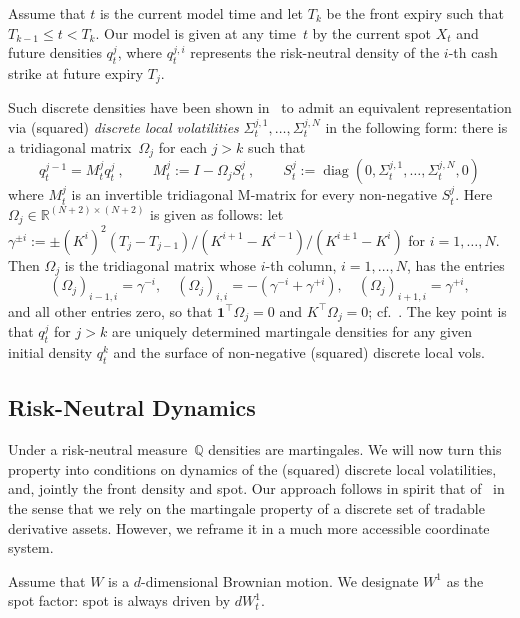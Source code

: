 \documentclass[smallextended,envcountsame,envcountsect]{svjour3}
\newcommand{\Q}{\mathbb Q}
\newcommand{\one}{\mathbf 1}
\begin{document}
Assume that $t$ is the current model time and let $T_k$ be the front expiry such that $T_{k-1}\leq t<T_k$.
Our model is given at any time~$t$
by the current spot $X_t$ and future densities $q_t^j$, where $q_t^{j,i}$ represents the risk-neutral density of the $i$-th cash strike at future expiry $T_j$.

Such discrete densities have been shown in~\citet{DLV} to admit an equivalent representation via (squared) \emph{discrete local volatilities} $\Sigma_t^{j,1},\ldots,\Sigma_t^{j,N}$ in the following form:
there is a tridiagonal matrix~$\Omega_j$ for each $j>k$ such that
  \begin{equation}
    q_t^{j-1}=M_t^jq_t^j \ ,
    \qquad
    M_t^j:=I-\Omega_jS_t^j \ ,
    \qquad
    S_t^j:=\operatorname{diag}(0,\Sigma_t^{j,1},\ldots,
      \Sigma_t^{j,N},0) 
    \label{eq:hb_dlv}
  \end{equation}
where $M^j_t$ is an invertible tridiagonal M-matrix for every non-negative $S_t^j$. Here $\Omega_j\in\mathbb R^{(N+2)\times(N+2)}$ is given as follows: let $\gamma^{\pm i} := \pm (K^{i})^2 (T_j-T_{j-1}) / (K^{i+1}-K^{i-1}) / (K^{i\pm 1} - K^i) $ for $i=1,\ldots,N$. Then $\Omega_j$ is the tridiagonal matrix whose $i$-th column, $i=1,\ldots,N$, has the entries
  \[
    (\Omega_j)_{i-1,i} = \gamma^{-i},\quad
    (\Omega_j)_{i,i} = -(\gamma^{-i}+\gamma^{+i}),\quad
    (\Omega_j)_{i+1,i} = \gamma^{+i},
  \]
and all other entries zero, so that $\one^{\!\top}\Omega_j=0$ and $K^{\!\top}\Omega_j=0$; cf.~\citep{SANOS2026}. The key point is that $q_t^j$ for $j>k$ are uniquely determined martingale densities
for any given initial density $q_t^k$ and the surface of non-negative (squared) discrete local vols.


  \subsection{Risk-Neutral Dynamics}

Under a risk-neutral measure~$\Q$ densities are martingales. We will now turn this property into conditions on dynamics of the (squared) discrete local volatilities, and, 
jointly the front density and spot. 
      Our approach follows in spirit that of~\citet{Wissel2007} in the sense that we rely on the martingale property of a discrete set of tradable derivative assets.
      However, we reframe it in a much more accessible coordinate system.

Assume that $W$ is a $d$-dimensional Brownian motion. We designate $W^1$ as the
      spot factor: spot is always driven by $dW_t^1$.
\end{document}
